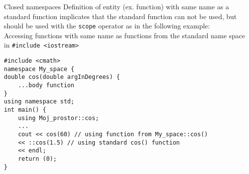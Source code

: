 \begin{frame}[fragile]{Closed namespaces}
Definition of entity (ex. function) with same name as a standard function
implicates that the standard function can not be used, but should be used with
the \texttt{scope} operator as in the following example:\\
Accessing functions with same name as functions from the standard name space in
\texttt{\#include <iostream>}
\begin{lstlisting}
#include <cmath>
namespace My_space {
double cos(double argInDegrees) {
    ...body function
}
using namespace std;
int main() {
    using Moj_prostor::cos;
    ...
    cout << cos(60) // using function from My_space::cos()
    << ::cos(1.5) // using standard cos() function
    << endl;
    return (0);
}
\end{lstlisting}
\end{frame}
% 
% 
% 
